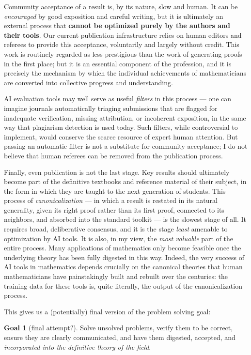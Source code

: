 \documentclass[12pt]{amsart}
\theoremstyle{definition}
\newtheorem{goal}{Goal}[section]
\begin{document}
Community acceptance of a result is, by its nature, slow and human.  It can be \emph{encouraged} by good exposition and careful writing, but it is ultimately an external process that \textbf{cannot be optimized purely by the authors and their tools}.  Our current publication infrastructure relies on human editors and referees to provide this acceptance, voluntarily and largely without credit.  This work is routinely regarded as less prestigious than the work of generating proofs in the first place; but it is an essential component of the profession, and it is precisely the mechanism by which the individual achievements of mathematicians are converted into collective progress and understanding.

AI evaluation tools may well serve as useful \emph{filters} in this process --- one can imagine journals automatically triaging submissions that are flagged for inadequate verification, missing attribution, or incoherent exposition, in the same way that plagiarism detection is used today.  Such filters, while controversial to implement, would conserve the scarce resource of expert human attention.  But passing an automatic filter is not a substitute for community acceptance; I do not believe that human referees can be removed from the publication process.

Finally, even publication is not the last stage.  Key results should ultimately become part of the definitive textbooks and reference material of their subject, in the form in which they are taught to the next generation of students.  This process of \emph{canonicalization} --- in which a result is restated in its natural generality, given its right proof rather than its first proof, connected to its neighbors, and absorbed into the standard toolkit --- is the slowest stage of all.  It requires broad, deliberative consensus, and it is the stage \emph{least} amenable to optimization by AI tools.  It is also, in my view, the \emph{most valuable} part of the entire process.  Many applications of mathematics only become feasible once the underlying theory has been fully digested in this way.  Indeed, the very success of AI tools in mathematics depends crucially on the canonical theories that human mathematicians have painstakingly built and rebuilt over the centuries: the training data for these tools is, quite literally, the output of the canonicalization process.

This gives us a (potentially) final version of the problem solving goal:

\begin{goal}[final attempt?]\label{goal5}
Solve unsolved problems, verify them to be correct, ensure they are clearly communicated, and have them digested, accepted, and \emph{incorporated into the definitive theory of the field}.
\end{goal}
\end{document}
